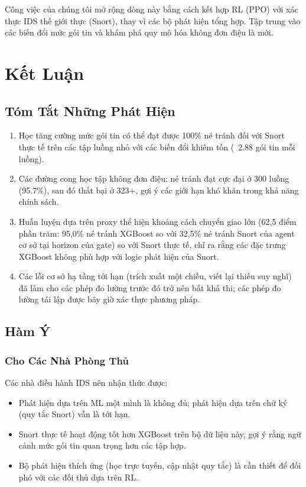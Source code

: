 \documentclass[12pt,a4paper]{report}
\begin{document}
Công việc của chúng tôi mở rộng dòng này bằng cách kết hợp RL (PPO) với xác thực IDS thế giới thực (Snort), thay vì các bộ phát hiện tổng hợp. Tập trung vào các biến đổi mức gói tin và khám phá quy mô hóa không đơn điệu là mới.

\chapter{Kết Luận}

\section{Tóm Tắt Những Phát Hiện}

\begin{enumerate}
  \item Học tăng cường mức gói tin có thể đạt được 100\% né tránh đối với Snort thực tế trên các tập luồng nhỏ với các biến đổi khiêm tốn (~2.88 gói tin mỗi luồng).
  
  \item Các đường cong học tập không đơn điệu: né tránh đạt cực đại ở 300 luồng (95.7\%), sau đó thất bại ở 323+, gợi ý các giới hạn khó khăn trong khả năng chính sách.
  
  \item Huấn luyện dựa trên proxy thể hiện khoảng cách chuyển giao lớn (62,5 điểm phần trăm: 95,0\% né tránh XGBoost so với 32,5\% né tránh Snort của agent cơ sở tại horizon của gate) so với Snort thực tế, chỉ ra rằng các đặc trưng XGBoost không phù hợp với logic phát hiện của Snort.
  
  \item Các lỗi cơ sở hạ tầng tới hạn (trích xuất một chiều, viết lại thiếu suy nghĩ) đã làm cho các phép đo lường trước đó trở nên bất khả thi; các phép đo lường tái lập được bây giờ xác thực phương pháp.
\end{enumerate}

\section{Hàm Ý}

\subsection{Cho Các Nhà Phòng Thủ}
Các nhà điều hành IDS nên nhận thức được:
\begin{itemize}
  \item Phát hiện dựa trên ML một mình là không đủ; phát hiện dựa trên chữ ký (quy tắc Snort) vẫn là tới hạn.
  \item Snort thực tế hoạt động tốt hơn XGBoost trên bộ dữ liệu này, gợi ý rằng ngữ cảnh mức gói tin quan trọng hơn các tập hợp.
  \item Bộ phát hiện thích ứng (học trực tuyến, cập nhật quy tắc) là cần thiết để đối phó với các đối thủ dựa trên RL.
\end{itemize}
\end{document}
